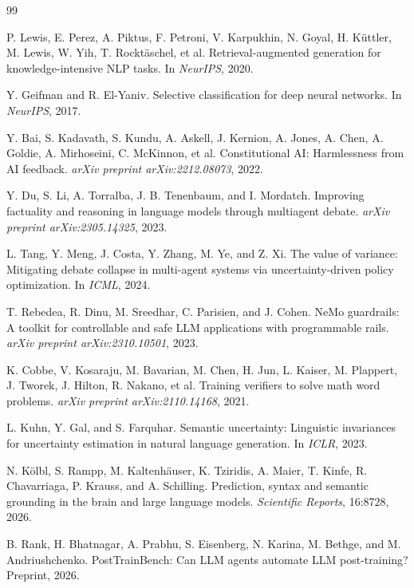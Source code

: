 \documentclass[11pt,a4paper]{article}
\begin{document}
\begin{thebibliography}{99}

P. Lewis, E. Perez, A. Piktus, F. Petroni, V. Karpukhin, N. Goyal, H. K\"{u}ttler,
M. Lewis, W. Yih, T. Rockt\"{a}schel, et al.
Retrieval-augmented generation for knowledge-intensive NLP tasks.
In \textit{NeurIPS}, 2020.

Y. Geifman and R. El-Yaniv.
Selective classification for deep neural networks.
In \textit{NeurIPS}, 2017.

Y. Bai, S. Kadavath, S. Kundu, A. Askell, J. Kernion, A. Jones, A. Chen, A. Goldie,
A. Mirhoseini, C. McKinnon, et al.
Constitutional {AI}: Harmlessness from {AI} feedback.
\textit{arXiv preprint arXiv:2212.08073}, 2022.

Y. Du, S. Li, A. Torralba, J. B. Tenenbaum, and I. Mordatch.
Improving factuality and reasoning in language models through multiagent debate.
\textit{arXiv preprint arXiv:2305.14325}, 2023.

L. Tang, Y. Meng, J. Costa, Y. Zhang, M. Ye, and Z. Xi.
The value of variance: Mitigating debate collapse in multi-agent systems via
uncertainty-driven policy optimization.
In \textit{ICML}, 2024.

T. Rebedea, R. Dinu, M. Sreedhar, C. Parisien, and J. Cohen.
{NeMo} guardrails: A toolkit for controllable and safe {LLM} applications
with programmable rails.
\textit{arXiv preprint arXiv:2310.10501}, 2023.

K. Cobbe, V. Kosaraju, M. Bavarian, M. Chen, H. Jun, L. Kaiser, M. Plappert,
J. Tworek, J. Hilton, R. Nakano, et al.
Training verifiers to solve math word problems.
\textit{arXiv preprint arXiv:2110.14168}, 2021.

L. Kuhn, Y. Gal, and S. Farquhar.
Semantic uncertainty: Linguistic invariances for uncertainty estimation in
natural language generation.
In \textit{ICLR}, 2023.

N. K\"{o}lbl, S. Rampp, M. Kaltenh\"{a}user, K. Tziridis, A. Maier, T. Kinfe,
R. Chavarriaga, P. Krauss, and A. Schilling.
Prediction, syntax and semantic grounding in the brain and large language models.
\textit{Scientific Reports}, 16:8728, 2026.

B. Rank, H. Bhatnagar, A. Prabhu, S. Eisenberg, N. Karina, M. Bethge, and
M. Andriushchenko.
{PostTrainBench}: Can {LLM} agents automate {LLM} post-training?
Preprint, 2026.


\end{thebibliography}
\end{document}
